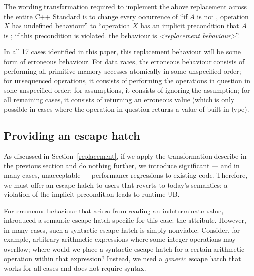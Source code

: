 {The wording transformation required to implement the above replacement across the entire C++ Standard is to change every occurrence of “if $A$ is not , operation $X$ has undefined behaviour'' to ``operation $X$ has an implicit precondition that $A$ is ; if this precondition is violated, the behaviour is \emph{<replacement behaviour>}''.

In all 17 cases identified in this paper, this replacement behaviour will be some form of erroneous behaviour. For data races, the erroneous behaviour consists of performing all primitive memory accesses atomically in some unspecified order; 
for unsequenced operations, it consists of performing the operations in question in sone unspecified order; for assumptions, it consists of ignoring the assumption; for all remaining cases, it consists of returning an erroneous value (which is only possible in cases where the operation in question returns a value of built-in type).

\subsection{Providing an escape hatch}
\label{assume}

As discussed in Section~\ref{replacement}, if we apply the transformation describe in the previous section and do nothing further, we introduce significant --- and in many cases, unacceptable --- performance regressions to existing code. Therefore, we must offer an escape hatch to users that reverts to today's semantics: a violation of the implicit precondition leads to runtime UB.

For erroneous behaviour that arises from reading an indeterminate value, \cite{P2795R5} introduced a semantic escape hatch specific for this case: the \tcode{[[indeterminate]]} attribute. However, in many cases, such a syntactic escape hatch is simply nonviable. Consider, for example, arbitrary arithmetic expressions where some integer operations may overflow; where would we place a syntactic escape hatch for a certain arithmetic operation within that expression? Instead, we need a \emph{generic} escape hatch that works for all cases and does not require syntax.

}
